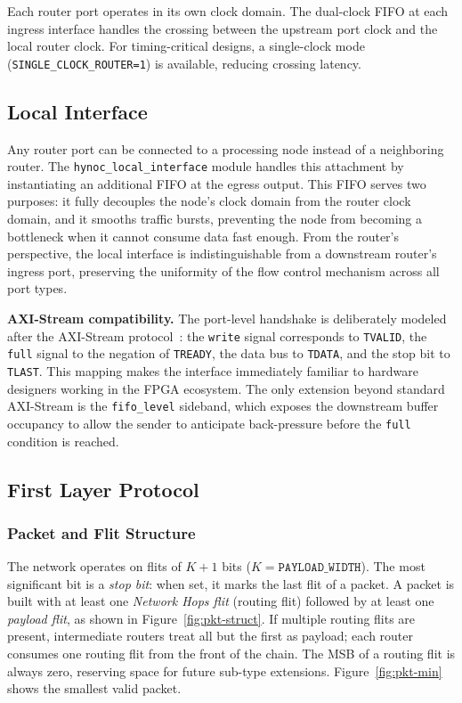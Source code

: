 Each router port operates in its own clock domain. The dual-clock FIFO at each
ingress interface handles the crossing between the upstream port clock and the
local router clock. For timing-critical designs, a single-clock mode
(\texttt{SINGLE\_CLOCK\_ROUTER=1}) is available, reducing crossing latency.

\subsection{Local Interface}

Any router port can be connected to a processing node instead of a neighboring
router. The \texttt{hynoc\_local\_interface} module handles this attachment by
instantiating an additional FIFO at the egress output. This FIFO serves two
purposes: it fully decouples the node's clock domain from the router clock domain,
and it smooths traffic bursts, preventing the node from becoming a bottleneck when
it cannot consume data fast enough. From the router's perspective, the local
interface is indistinguishable from a downstream router's ingress port, preserving
the uniformity of the flow control mechanism across all port types.

\textbf{AXI-Stream compatibility.} The port-level handshake is deliberately
modeled after the AXI-Stream protocol~\cite{arm_axi}: the \texttt{write} signal
corresponds to \texttt{TVALID}, the \texttt{full} signal to the negation of
\texttt{TREADY}, the data bus to \texttt{TDATA}, and the stop bit to
\texttt{TLAST}. This mapping makes the interface immediately familiar to hardware
designers working in the FPGA ecosystem. The only extension beyond standard
AXI-Stream is the \texttt{fifo\_level} sideband, which exposes the downstream
buffer occupancy to allow the sender to anticipate back-pressure before the
\texttt{full} condition is reached.


\subsection{First Layer Protocol}

\subsubsection{Packet and Flit Structure}

The network operates on flits of $K+1$ bits ($K = \mathtt{PAYLOAD\_WIDTH}$). The
most significant bit is a \emph{stop bit}: when set, it marks the last flit of a
packet. A packet is built with at least one \emph{Network Hops flit} (routing
flit) followed by at least one \emph{payload flit}, as shown in
Figure~\ref{fig:pkt-struct}. If multiple routing flits are present, intermediate
routers treat all but the first as payload; each router consumes one routing flit
from the front of the chain. The MSB of a routing flit is always zero, reserving
space for future sub-type extensions. Figure~\ref{fig:pkt-min} shows the smallest
valid packet.

